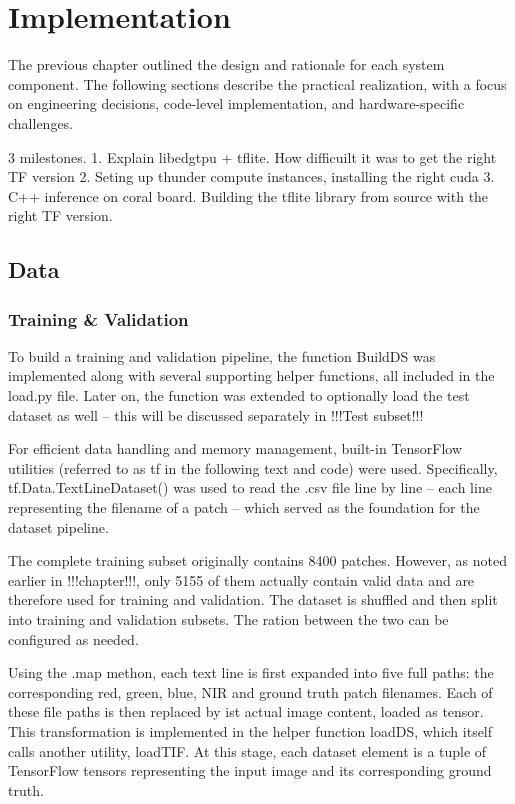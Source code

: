 {

\setlength{\parindent}{0pt}
\setlength{\parskip}{1em}

\chapter{Implementation}

The previous chapter outlined the design and rationale for each system component. The following sections describe the practical realization, with a focus on engineering decisions, code-level implementation, and hardware-specific challenges.


3 milestones.
1. Explain libedgtpu + tflite. How difficuilt it was to get the right TF version
2. Seting up thunder compute instances, installing the right cuda
3. C++ inference on coral board. Building the tflite library from source with the right TF version. 


\section{Data}
\label{sec:data}

\subsection{Training \& Validation}

To build a training and validation pipeline, the function BuildDS was implemented along with several supporting helper functions, all included in the load.py file. Later on, the function was extended to optionally load the test dataset as well – this will be discussed separately in !!!Test subset!!!

For efficient data handling and memory management, built-in TensorFlow utilities (referred to as tf in the following text and code) were used. Specifically, tf.Data.TextLineDataset() was used to read the .csv file line by line – each line representing the filename of a patch – which served as the foundation for the dataset pipeline.

The complete training subset originally contains 8400 patches. However, as noted earlier in !!!chapter!!!, only 5155 of them actually contain valid data and are therefore used for training and validation. The dataset is shuffled and then split into training and validation subsets. The ration between the two can be configured as needed.

Using the .map methon, each text line is first expanded into five full paths: the corresponding red, green, blue, NIR and ground truth patch filenames. Each of these file paths is then replaced by ist actual image content, loaded as tensor. This transformation is implemented in the helper function loadDS, which itself calls another utility, loadTIF. At this stage, each dataset element is a tuple of TensorFlow tensors representing the input image and its corresponding ground truth.

}
